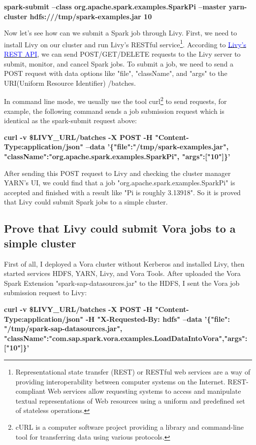 \documentclass[article,colorback,accentcolor=tud4c]{tudreport}
\begin{document}
	\noindent\textbf{spark-submit --class org.apache.spark.examples.SparkPi   --master yarn-cluster hdfs:///tmp/spark-examples.jar 10}
		
	Now let's see how can we submit a Spark job through Livy. First, we need to install Livy on our cluster and run Livy's RESTful service\footnote{Representational state transfer (REST) or RESTful web services are a way of providing interoperability between computer systems on the Internet. REST-compliant Web services allow requesting systems to access and manipulate textual representations of Web resources using a uniform and predefined set of stateless operations.}. According to \href{https://livy.incubator.apache.org/docs/latest/rest-api.html}{\textcolor{blue}{Livy's REST API}}, we can send POST/GET/DELETE requests to the Livy server to submit, monitor, and cancel Spark jobs. To submit a job, we need to send a POST request with data options like "file", "className", and "args" to the URI(Uniform Resource Identifier) /batches. 
	
	In command line mode, we usually use the tool curl\footnote{cURL is a computer software project providing a library and command-line tool for transferring data using various protocols.} to send requests, for example, the following command sends a job submission request which is identical as the spark-submit request above:
	
	\noindent\textbf{curl -v \$LIVY\_URL/batches -X POST -H "Content-Type:application/json" --data '\{"file":"/tmp/spark-examples.jar", "className":"org.apache.spark.examples.SparkPi", "args":["10"]\}'}
	
	After sending this POST request to Livy and checking the cluster manager YARN's UI, we could find that a job "org.apache.spark.examples.SparkPi" is accepted and finished with a result like "Pi is roughly 3.13918". So it is proved that Livy could submit Spark jobs to a simple cluster.
		
	\subsection{Prove that Livy could submit Vora jobs to a simple cluster}
	
	First of all, I deployed a Vora cluster without Kerberos and installed Livy, then started services HDFS, YARN, Livy, and Vora Tools. After uploaded the Vora Spark Extension "spark-sap-datasources.jar" to the HDFS, I sent the Vora job submission request to Livy:
	
	\noindent\textbf{curl -v \$LIVY\_URL/batches -X POST -H "Content-Type:application/json" -H "X-Requested-By: hdfs" --data '\{"file": "/tmp/spark-sap-datasources.jar", "className":"com.sap.spark.vora.examples.LoadDataIntoVora","args":["10"]\}'}
	
\end{document}
